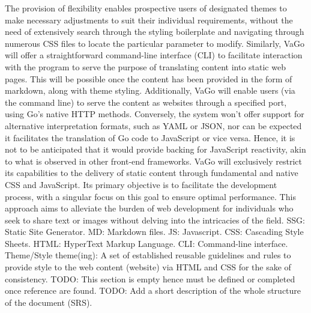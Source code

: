 {}The provision of flexibility enables prospective users of designated themes to make necessary adjustments to suit their individual requirements, without the need of extensively search through the styling boilerplate and navigating through numerous CSS files to locate the particular parameter to modify.\markdownRendererInterblockSeparator
{}Similarly, VaGo will offer a straightforward command-line interface (CLI) to facilitate interaction with the program to serve the purpose of translating content into static web pages. This will be possible once the content has been provided in the form of markdown, along with theme styling. Additionally, VaGo will enable users (via the command line) to serve the content as websites through a specified port, using Go's native HTTP methods.\markdownRendererInterblockSeparator
{}Conversely, the system won't offer support for alternative interpretation formats, such as YAML or JSON, nor can be expected it facilitates the translation of Go code to JavaScript or vice versa. Hence, it is not to be anticipated that it would provide backing for JavaScript reactivity, akin to what is observed in other front-end frameworks. VaGo will exclusively restrict its capabilities to the delivery of static content through fundamental and native CSS and JavaScript. Its primary objective is to facilitate the development process, with a singular focus on this goal to ensure optimal performance. This approach aims to alleviate the burden of web development for individuals who seek to share text or images without delving into the intricacies of the field.\markdownRendererInterblockSeparator
{}\markdownRendererInterblockSeparator
{}\markdownRendererUlBeginTight
\markdownRendererUlItem SSG: Static Site Generator.\markdownRendererUlItemEnd 
\markdownRendererUlItem MD: Markdown files.\markdownRendererUlItemEnd 
\markdownRendererUlItem JS: Javascript.\markdownRendererUlItemEnd 
\markdownRendererUlItem CSS: Cascading Style Sheets.\markdownRendererUlItemEnd 
\markdownRendererUlItem HTML: HyperText Markup Language.\markdownRendererUlItemEnd 
\markdownRendererUlItem CLI: Command-line interface.\markdownRendererUlItemEnd 
\markdownRendererUlItem Theme/Style theme(ing): A set of established reusable guidelines and rules to provide style to the web content (website) via HTML and CSS for the sake of consistency. \markdownRendererUlItemEnd 
\markdownRendererUlEndTight \markdownRendererInterblockSeparator
{}\markdownRendererInterblockSeparator
{}TODO: This section is empty hence must be defined or completed once reference are found. \markdownRendererInterblockSeparator
{}\markdownRendererInterblockSeparator
{}TODO: Add a short description of the whole structure of the document (SRS).\markdownRendererDocumentEnd